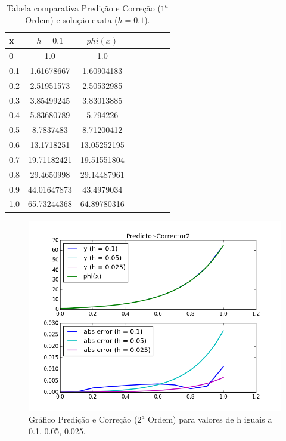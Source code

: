 \documentclass[a4paper]{article}
\begin{document}
\begin{table}[!h]
\centering
\begin{tabular}{l*{6}{c}r}
x               & $h=0.1$ & $phi(x)$ \\
\hline
0                   & 1.0 & 1.0          \\
0.1                 & 1.61678667 & 1.60904183   \\
0.2                 & 2.51951573 & 2.50532985   \\
0.3                 & 3.85499245 & 3.83013885   \\
0.4                 & 5.83680789 & 5.794226     \\
0.5                 & 8.7837483 & 8.71200412   \\
0.6                 & 13.1718251 & 13.05252195  \\
0.7                 & 19.71182421 & 19.51551804  \\
0.8                 & 29.4650998 & 29.14487961  \\
0.9                 & 44.01647873 & 43.4979034   \\
1.0                 & 65.73244368 & 64.89780316  \\
\end{tabular}
\caption{\label{tab:pc1}Tabela comparativa Predição e Correção ($1^a$ Ordem) e solução exata ($h=0.1$).}
\end{table}

\begin{figure}[b]
\centering
\includegraphics[width=1.0\textwidth]{plots/Predictor-Corrector2.png}
\caption{\label{fig:pc1}Gráfico Predição e Correção ($2^a$ Ordem) para valores de h iguais a 0.1, 0.05, 0.025.}
\end{figure}
\end{document}
